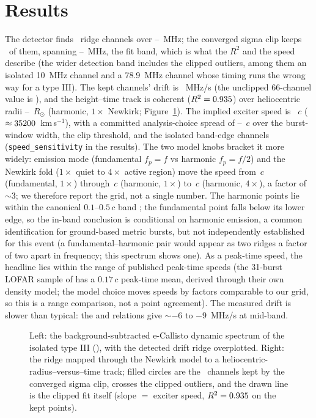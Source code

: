 \documentclass[twocolumn]{aastex631}
\newcommand{\code}[1]{\texttt{#1}}
\begin{document}
\section{Results}
The detector finds \sbNridge\ ridge channels over \sbFlo--\sbFhi~MHz; the converged sigma clip
keeps \sbNused\ of them, spanning \sbFitFlo--\sbFitFhi~MHz, the fit band, which is what the $R^2$ and the speed describe (the wider detection band includes the clipped outliers, among them
an isolated 10~MHz channel and a 78.9~MHz channel whose timing runs the wrong way for a type
III). The kept channels' drift is \sbDriftUsed~MHz/s (the unclipped 66-channel value is
\sbDrift), and the height--time track is coherent ($R^2=0.935$) over heliocentric radii
\sbRlo--\sbRhi~$R_\odot$ (harmonic, $1\times$ Newkirk; Figure~\ref{fig:burst}). The implied
exciter speed is \sbSpeedC~$c$ ($\approx35200$~km\,s$^{-1}$), with a committed
analysis-choice spread of \sbSpeedCMin--\sbSpeedCMax~$c$ over the burst-window width, the clip
threshold, and the isolated band-edge channels
(\code{speed\_sensitivity} in the results). The two model knobs bracket it more widely:
emission mode (fundamental $f_p=f$ vs harmonic $f_p=f/2$) and the Newkirk fold ($1\times$ quiet
to $4\times$ active region) move the speed from \sbGridFundOne$\,c$ (fundamental, $1\times$)
through \sbGridHarmOne$\,c$ (harmonic, $1\times$) to \sbGridHarmFour$\,c$ (harmonic, $4\times$),
a factor of $\sim$3; we therefore report the grid, not a single number. The harmonic points lie
within the canonical $0.1$--$0.5\,c$ band \citep{reidratcliffe2014}; the fundamental point falls
below its lower edge, so the in-band conclusion is conditional on harmonic emission, a common identification for ground-based metric bursts, but not independently established for this event
(a fundamental--harmonic pair would appear as two ridges a factor of two apart in frequency;
this spectrum shows one). As a peak-time speed, the headline lies within the range of published
peak-time speeds (the 31-burst {LOFAR} sample of \citealt{reidkontar2018} has a $0.17\,c$
peak-time mean, derived through their own density model; the model choice moves speeds by factors comparable to our grid, so this is a range comparison, not a point agreement). The
measured drift is slower than typical: the \citet{alvarez1973} and \citet{zhang2018} relations
give $\sim-6$ to $-9$~MHz/s at mid-band.

\begin{figure}
\caption{Left: the background-subtracted e-Callisto dynamic spectrum of the isolated type III
(\sbSource), with the detected drift ridge overplotted. Right: the ridge mapped through the
Newkirk model to a heliocentric-radius--versus--time track; filled circles are the
\sbNused\ channels kept by the converged sigma clip, crosses the clipped outliers, and the drawn
line is the clipped fit itself (slope $=$ exciter speed, $R^2=0.935$ on the kept points).}
\label{fig:burst}
\end{figure}
\end{document}

